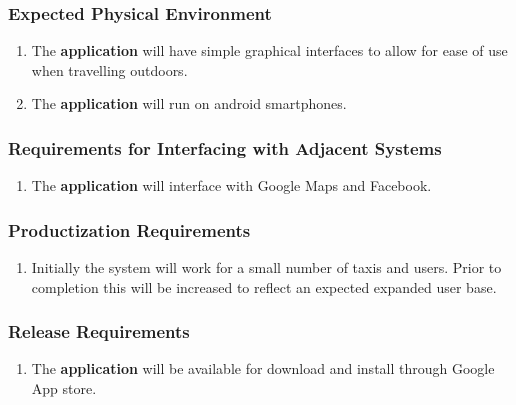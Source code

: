 \documentclass[english]{article}
\begin{document}
\subsubsection{Expected Physical Environment}
\label{ssub:expected_physical_environment}
\begin{enumerate}[{OE}1. ]
	\item The \textbf{application} will have simple graphical interfaces to allow for ease of use when travelling outdoors.
	\item The \textbf{application} will run on android smartphones.
\end{enumerate}

\subsubsection{Requirements for Interfacing with Adjacent Systems}
\label{ssub:requirements_for_interfacing_with_adjacent_systems}
\begin{enumerate}[{OE}1. ]
	\item The \textbf{application} will interface with Google Maps and Facebook.
\end{enumerate}

\subsubsection{Productization Requirements}
\label{ssub:productization_requirements}
\begin{enumerate}[{OE}1. ]
	\item Initially the system will work for a small number of taxis and users. Prior to completion this will be increased to reflect an expected expanded user base.
\end{enumerate}

\subsubsection{Release Requirements}
\label{ssub:release_requirements}
\begin{enumerate}[{OE}1. ]
	\item The \textbf{application} will be available for download and install through Google App store.
\end{enumerate}

\end{document}
